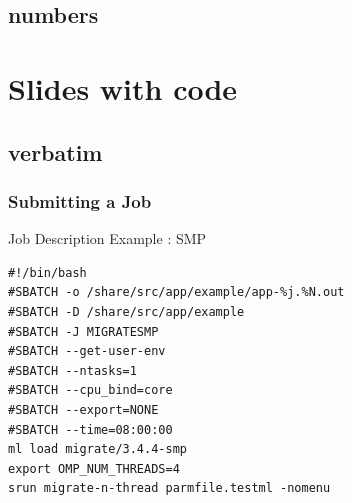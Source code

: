 \documentclass{beamer}
\begin{document}
\subsection{numbers}

\section{Slides with code}
\subsection{verbatim}
\begin{frame}[fragile]
  \frametitle{Submitting a Job}
      \begin{block}{Job Description Example : SMP}
\begin{small}
\begin{verbatim}
#!/bin/bash
#SBATCH -o /share/src/app/example/app-%j.%N.out
#SBATCH -D /share/src/app/example
#SBATCH -J MIGRATESMP
#SBATCH --get-user-env
#SBATCH --ntasks=1
#SBATCH --cpu_bind=core
#SBATCH --export=NONE
#SBATCH --time=08:00:00
ml load migrate/3.4.4-smp
export OMP_NUM_THREADS=4
srun migrate-n-thread parmfile.testml -nomenu
\end{verbatim}
\end{small}
  \end{block}
\end{frame}
\end{document}
